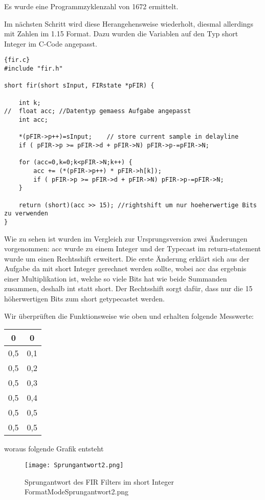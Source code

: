  Es wurde eine Programmzyklenzahl von 1672 ermittelt.
 
 Im nächsten Schritt wird diese Herangehensweise wiederholt, diesmal allerdings mit Zahlen im 1.15 Format. Dazu wurden die Variablen auf den Typ short Integer im C-Code angepasst.
 \begin{adjustbox}{width=\textwidth,height=\textheight,keepaspectratio}
 \begin{lstlisting}[title=fir.c]{fir.c}
#include "fir.h"

short fir(short sInput, FIRstate *pFIR) {

	int k;
//	float acc; //Datentyp gemaess Aufgabe angepasst
	int acc;
	
	*(pFIR->p++)=sInput;	// store current sample in delayline
	if ( pFIR->p >= pFIR->d + pFIR->N) pFIR->p-=pFIR->N;

	for (acc=0,k=0;k<pFIR->N;k++) {
		acc += (*(pFIR->p++) * pFIR->h[k]);
		if ( pFIR->p >= pFIR->d + pFIR->N) pFIR->p-=pFIR->N;
	}
	
	return (short)(acc >> 15); //rightshift um nur hoeherwertige Bits zu verwenden
}
\end{lstlisting}
\end{adjustbox}
Wie zu sehen ist wurden im Vergleich zur Ursprungsversion zwei \"Anderungen vorgenommen: acc wurde zu einem Integer und der Typecast im return-statement wurde um einen Rechtsshift erweitert. Die erste \"Anderung erklärt sich aus der Aufgabe da mit short Integer gerechnet werden sollte, wobei acc das ergebnis einer Multiplikation ist, welche so viele Bits hat wie beide Summanden zusammen, deshalb int statt short. Der Rechtsshift sorgt daf\"ur, dass nur die 15 h\"oherwertigen Bits zum short getypecastet werden.\\\par
Wir \"uberprüften die Funktionsweise wie oben und erhalten folgende Messwerte:
\begin{tabular}{|c|c|}
\hline 
0 & 0 \\ 
\hline 
0,5 & 0,1 \\ 
\hline 
0,5 & 0,2 \\ 
\hline 
0,5 & 0,3 \\ 
\hline 
0,5 & 0,4 \\ 
\hline 
0,5 & 0,5 \\ 
\hline 
0,5 & 0,5 \\ 
\hline 
\end{tabular} 
woraus folgende Grafik entsteht 
\begin{figure}[H]
  \centering
    \texttt{[image: Sprungantwort2.png]}
  \caption{Sprungantwort des FIR Filters im short Integer Format\textunderscore Mode\textunderscore Sprungantwort2.png}
  \label{fig:SprAW2.png}%
\end{figure}
